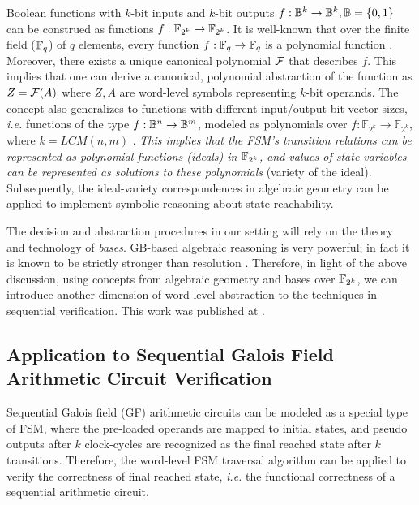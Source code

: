 Boolean functions with $k$-bit inputs and $k$-bit outputs 
$f: {\mathbb{B}}^k \rightarrow {\mathbb{B}}^k,{\mathbb{B}} = \{0, 1\}$ can be construed as functions
$f: {\mathbb{F}}_{2^k} \rightarrow {\mathbb{F}}_{2^k}$. It is well-known that over the finite
field (${\mathbb{F}}_{q}$) of  $q$ elements, every function $f: {\mathbb{F}}_{q}
\rightarrow {\mathbb{F}}_{q}$ is a polynomial function \cite{ff:1997}. Moreover,
there exists a unique canonical polynomial ${\mathcal{F}}$ that describes $f$.
This implies that one can derive a canonical, polynomial
  abstraction of the function as $Z = {\mathcal{F}}(A)$ where $Z, A$ are
word-level symbols representing $k$-bit operands. The concept also
generalizes to functions with different input/output bit-vector sizes,
{\it i.e.} functions of the type $f: {\mathbb{B}}^n \rightarrow {\mathbb{B}}^m$, modeled as
polynomials over $f:{\mathbb{F}}_{2^k} \rightarrow
{\mathbb{F}}_{2^k}$, where $k=LCM(n,m)$ \cite{ff:1997}.  
{\it This implies that the FSM's transition relations can be
represented as polynomial functions (ideals) in ${\mathbb{F}}_{2^k}$, and values of
state variables can be represented as solutions to these polynomials}
(variety of the ideal). Subsequently, the ideal-variety correspondences
in algebraic geometry can be applied to implement symbolic reasoning
about state reachability. 

The decision and abstraction procedures in our setting will rely on
the theory and technology of {\it \Grobner bases}. GB-based
algebraic reasoning is very powerful; in fact it is known to be
strictly stronger than resolution \cite{CEI:stoc-96}. Therefore, in
light of the above discussion, using concepts from algebraic geometry
and \Grobner bases over ${\mathbb{F}}_{2^k}$, we can introduce another dimension of
word-level abstraction to the techniques in sequential verification. 
This work was published at \cite{myHLDVT}.

\subsection{Application to Sequential Galois Field Arithmetic Circuit Verification}
Sequential Galois field (GF) arithmetic circuits can be modeled as a special type of 
FSM, where the pre-loaded operands are mapped to initial states, and pseudo outputs
after $k$ clock-cycles are recognized as the final reached state after $k$ transitions.
Therefore, the word-level FSM traversal algorithm can be applied to 
verify the correctness of final reached state, {\it i.e.} the functional correctness of
a sequential arithmetic circuit.

